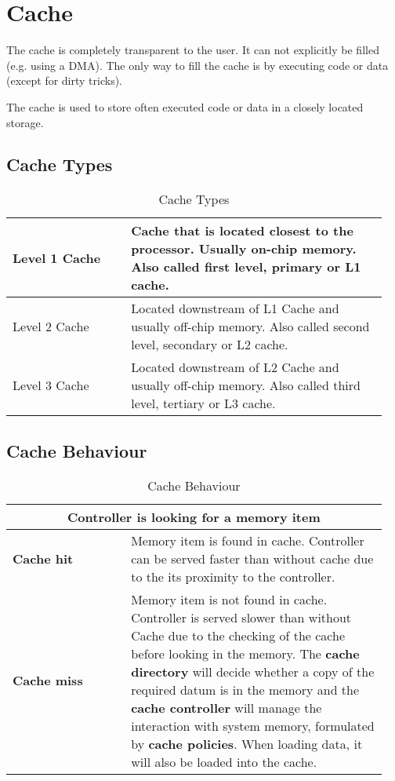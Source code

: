 \section{Cache }
	The cache is completely transparent to the user. It can not explicitly be filled (e.g. using a DMA). The only way to fill the cache is by executing code or data (except for dirty tricks).
	
	The cache is used to store often executed code or data in a closely located storage.
	
	\subsection{Cache Types}
		\begin{table}[H]
			\centering
			\begin{tabular}{|p{0.3\linewidth}|p{0.65\linewidth}|}
				\hline
				Level 1 Cache
					& Cache that is located closest to the processor. Usually on-chip memory. Also called first level, primary or L1 cache.\\
				\hline
				Level 2 Cache
					& Located downstream of L1 Cache and usually off-chip memory. Also called second level, secondary or L2 cache.\\
				\hline
				Level 3 Cache
					& Located downstream of L2 Cache and usually off-chip memory. Also called third level, tertiary or L3 cache.\\
				\hline	
			\end{tabular}
			\caption{Cache Types}
		\end{table}
		
	\subsection{Cache Behaviour }
	
		\begin{table}[H]
			\centering
			\begin{tabular}{|p{0.3\linewidth}|p{0.65\linewidth}|}
				\hline
				\multicolumn{2}{|c|}{Controller is looking for a memory item}\\
				\hline
				\textbf{Cache hit}
					& Memory item is found in cache. Controller can be served faster than without cache due to the its proximity to the controller.\\
				\hline
				\textbf{Cache miss}
					& Memory item is not found in cache. Controller is served slower than without Cache due to the checking of the cache before looking in the memory. The \textbf{cache directory} will decide whether a copy of the required datum is in the memory and the \textbf{cache controller} will manage the interaction with system memory, formulated by \textbf{cache policies}. When loading data, it will also be loaded into the cache.\\
				\hline
			\end{tabular}
			\caption{Cache Behaviour}
		\end{table}
		
